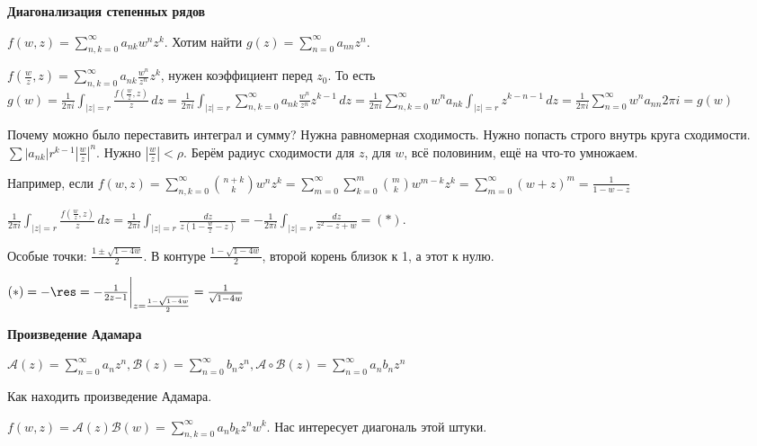 \begin{example}
    \textbf{Диагонализация степенных рядов}

    $f(w, z) = \sum_{n, k = 0}^{\infty} a_{nk} w^n z^k$. Хотим найти $g(z) = \sum_{n = 0}^{\infty} a_{nn}z^n$.
    
    $f(\frac{w}{z}, z) = \sum_{n, k = 0}^{\infty} a_{nk} \frac{w^n}{z^n} z^k$, нужен коэффициент перед $z_0$.
    То есть $g(w) = \frac{1}{2\pi i} \int_{|z| = r} \frac{f(\frac{w}{z}, z)}{z} \, dz = \frac{1}{2\pi i} \int_{|z| = r} \sum_{n, k = 0}^{\infty} a_{nk} \frac{w^n}{z^n} z^{k - 1} \, dz = \frac{1}{2\pi i} \sum_{n, k = 0}^{\infty} w^n a_{nk} \int_{|z| = r} z^{k - n - 1} \, dz = 
    \frac{1}{2\pi i} \sum_{n = 0}^{\infty} w^n a_{nn} 2\pi i = g(w)$

    Почему можно было переставить интеграл и сумму? Нужна равномерная сходимость. Нужно попасть строго внутрь
    круга сходимости. $\sum |a_{nk}| r^{k-1} \left |\frac{w}{z} \right |^n$. Нужно $\left | \frac{w}{z} \right | < \rho$. Берём
    радиус сходимости для $z$, для $w$, всё половиним, ещё на что-то умножаем.

    Например, если $f(w, z) = \sum_{n, k = 0}^{\infty} \binom{n+k}{k}w^nz^k = \sum_{m = 0}^{\infty} \sum_{k = 0}^{m} \binom{m}{k} w^{m - k}z^k = \sum_{m = 0}^{\infty} (w + z)^m = \frac{1}{1 - w - z}$

    $\frac{1}{2\pi i} \int_{|z| = r} \frac{f(\frac{w}{z}, z)}{z} \, dz = \frac{1}{2\pi i} \int_{|z| = r} \frac{dz}{z(1 - \frac{w}{z} - z)} = -\frac{1}{2\pi i} \int_{|z| = r} \frac{dz}{z^2 - z + w} = (*)$.

    Особые точки: $\frac{1 \pm \sqrt{1 - 4w}}{2}$. В контуре $\frac{1 - \sqrt{1 - 4w}}{2}$, второй корень близок к 1, а этот к нулю.

    $(*) = - \res = -\frac{1}{2z - 1} \bigg |_{z = \frac{1 - \sqrt{1 - 4w}}{2}} = \frac{1}{\sqrt{1 - 4w}}$

\end{example}

\begin{definition}
    \textbf{Произведение Адамара}

    $\mathcal{A}(z) = \sum_{n = 0}^{\infty} a_nz^n, \mathcal{B}(z) = \sum_{n=0}^{\infty} b_nz^n, \mathcal{A} \circ \mathcal{B} (z) = \sum_{n = 0}^{\infty} a_nb_n z^n$ 
\end{definition}

\begin{example}
    Как находить произведение Адамара.

    $f(w, z) = \mathcal{A}(z) \mathcal{B}(w) = \sum_{n, k = 0}^{\infty} a_nb_kz^nw^k$. Нас интересует диагональ этой штуки.
\end{example}

